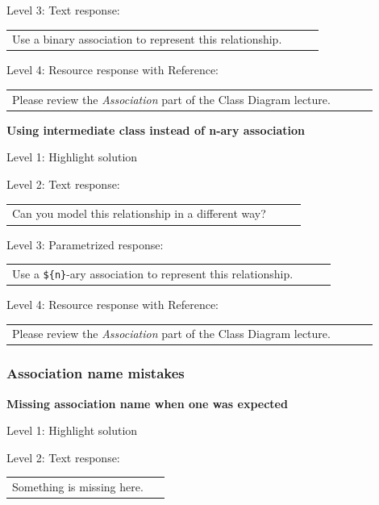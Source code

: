 \noindent Level 3: Text response: \medskip

\begin{tabular}{|p{0.9\linewidth}}
Use a binary association to represent this relationship.
\end{tabular} \medskip

\noindent Level 4: Resource response with Reference: \medskip

\begin{tabular}{|p{0.9\linewidth}}
Please review the \textit{Association} part of the Class Diagram lecture.
\end{tabular} \medskip


\noindent \textbf{Using intermediate class instead of n-ary association} \medskip

\noindent Level 1: Highlight solution \medskip

\noindent Level 2: Text response: \medskip

\begin{tabular}{|p{0.9\linewidth}}
Can you model this relationship in a different way?
\end{tabular} \medskip

\noindent Level 3: Parametrized response: \medskip

\begin{tabular}{|p{0.9\linewidth}}
Use a \verb|${n}|-ary association to represent this relationship.
\end{tabular} \medskip

\noindent Level 4: Resource response with Reference: \medskip

\begin{tabular}{|p{0.9\linewidth}}
Please review the \textit{Association} part of the Class Diagram lecture.
\end{tabular} \medskip


\subsubsection{Association name mistakes}

\noindent \textbf{Missing association name when one was expected} \medskip

\noindent Level 1: Highlight solution \medskip

\noindent Level 2: Text response: \medskip

\begin{tabular}{|p{0.9\linewidth}}
Something is missing here.
\end{tabular} \medskip

